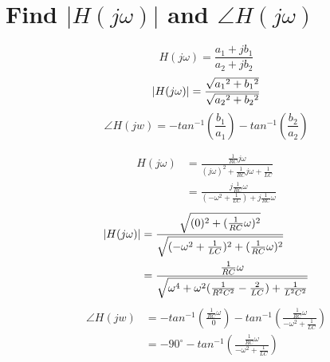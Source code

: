 \documentclass[12pt]{report}
\newcommand{\adj}{\hspace{0.001em}}
\begin{document}
\section{Find $ |H(j\omega)| $ and $ \angle H(j\omega) $}

\begin{equation*}
	H(j\omega) = \frac{a_1 + jb_1}{a_2 + jb_2}
\end{equation*}
\begin{equation*}
	|H(j\omega)| = \frac{\sqrt{a_1\adj^2 + b_1\adj^2}}{\sqrt{a_2\adj^2 + b_2\adj^2}}
\end{equation*}
\begin{equation*}
	\angle H(jw) = -tan^{-1}(\frac{b_1}{a_1}) - tan^{-1}(\frac{b_2}{a_2})
\end{equation*}

\begin{align*}
	H(j\omega) &= \frac{\frac{1}{RC}j\omega}{(j\omega)^2 + \frac{1}{RC}j\omega + \frac{1}{LC}} \\
	&= \frac{j\frac{1}{RC}\omega}{(-\omega^2 + \frac{1}{LC}) + j\frac{1}{RC}\omega}
\end{align*}
\begin{align*}
	|H(j\omega)| &= \frac{\sqrt{(0)\adj^2 + (\frac{1}{RC}\omega)^2}}{\sqrt{(-\omega^2 + \frac{1}{LC})^2 + (\frac{1}{RC}\omega)^2}} \\
	&= \frac{\frac{1}{RC}\omega}{\sqrt{\omega^4 + \omega^2(\frac{1}{R^2C^2} - \frac{2}{LC}) + \frac{1}{L^2C^2}}}
\end{align*}
\begin{align*}
	\angle H(jw) &= -tan^{-1}(\frac{\frac{1}{RC}\omega}{0}) - tan^{-1}(\frac{\frac{1}{RC}\omega}{-\omega^2 + \frac{1}{LC}}) \\
	&= -90^\circ - tan^{-1}(\frac{\frac{1}{RC}\omega}{-\omega^2 + \frac{1}{LC}})
\end{align*}
\end{document}
